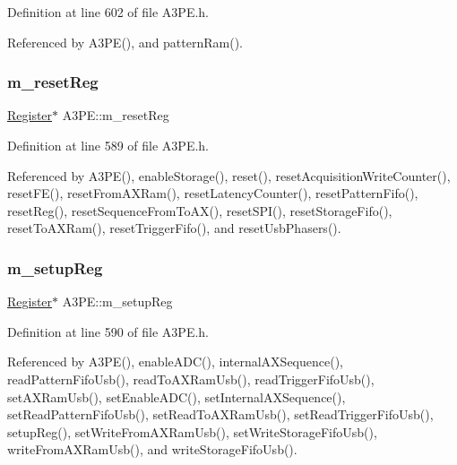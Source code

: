 Definition at line 602 of file A3\+P\+E.\+h.



Referenced by A3\+P\+E(), and pattern\+Ram().

\mbox{\label{classA3PE_ab4db5f00976e5095686f108c8febf702}} 
\subsubsection{\texorpdfstring{m\+\_\+reset\+Reg}{m\_resetReg}}
{\footnotesize\ttfamily \hyperlink{classRegister}{Register}$\ast$ A3\+P\+E\+::m\+\_\+reset\+Reg\hspace{0.3cm}{\ttfamily [private]}}



Definition at line 589 of file A3\+P\+E.\+h.



Referenced by A3\+P\+E(), enable\+Storage(), reset(), reset\+Acquisition\+Write\+Counter(), reset\+F\+E(), reset\+From\+A\+X\+Ram(), reset\+Latency\+Counter(), reset\+Pattern\+Fifo(), reset\+Reg(), reset\+Sequence\+From\+To\+A\+X(), reset\+S\+P\+I(), reset\+Storage\+Fifo(), reset\+To\+A\+X\+Ram(), reset\+Trigger\+Fifo(), and reset\+Usb\+Phasers().

\mbox{\label{classA3PE_a142fa10b7e705c4701ae21678ec2ec8a}} 
\subsubsection{\texorpdfstring{m\+\_\+setup\+Reg}{m\_setupReg}}
{\footnotesize\ttfamily \hyperlink{classRegister}{Register}$\ast$ A3\+P\+E\+::m\+\_\+setup\+Reg\hspace{0.3cm}{\ttfamily [private]}}



Definition at line 590 of file A3\+P\+E.\+h.



Referenced by A3\+P\+E(), enable\+A\+D\+C(), internal\+A\+X\+Sequence(), read\+Pattern\+Fifo\+Usb(), read\+To\+A\+X\+Ram\+Usb(), read\+Trigger\+Fifo\+Usb(), set\+A\+X\+Ram\+Usb(), set\+Enable\+A\+D\+C(), set\+Internal\+A\+X\+Sequence(), set\+Read\+Pattern\+Fifo\+Usb(), set\+Read\+To\+A\+X\+Ram\+Usb(), set\+Read\+Trigger\+Fifo\+Usb(), setup\+Reg(), set\+Write\+From\+A\+X\+Ram\+Usb(), set\+Write\+Storage\+Fifo\+Usb(), write\+From\+A\+X\+Ram\+Usb(), and write\+Storage\+Fifo\+Usb().

